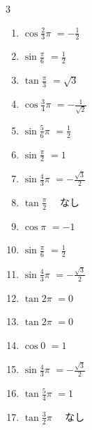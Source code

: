 \begin{multicols}{3}
\begin{enumerate}
  \item $\displaystyle \cos{\frac{2}{3}\pi}$
        $\displaystyle =-\frac{1}{2}$

  \item $\displaystyle \sin{\frac{\pi}{6}}$
        $\displaystyle =\frac{1}{2}$

  \item $\displaystyle \tan{\frac{\pi}{3}}$
        $\displaystyle =\sqrt{3}$

  \item $\displaystyle \cos{\frac{3}{4}\pi}$
        $\displaystyle =-\frac{1}{\sqrt{2}}$

  \item $\displaystyle \sin{\frac{5}{6}\pi}$
        $\displaystyle =\frac{1}{2}$

  \item $\displaystyle \sin{\frac{\pi}{2}}$
        $\displaystyle =1$

  \item $\displaystyle \sin{\frac{4}{3}\pi}$
        $\displaystyle =-\frac{\sqrt{3}}{2}$

  \item $\displaystyle \tan{\frac{\pi}{2}}$
        $\displaystyle \quad なし$

  \item $\displaystyle \cos{\pi}$
        $\displaystyle =-1$

  \item $\displaystyle \sin{\frac{\pi}{6}}$
        $\displaystyle =\frac{1}{2}$

  \item $\displaystyle \sin{\frac{4}{3}\pi}$
        $\displaystyle =-\frac{\sqrt{3}}{2}$

  \item $\displaystyle \tan{2\pi}$
        $\displaystyle =0$

  \item $\displaystyle \tan{2\pi}$
        $\displaystyle =0$

  \item $\displaystyle \cos{0}$
        $\displaystyle =1$

  \item $\displaystyle \sin{\frac{4}{3}\pi}$
        $\displaystyle =-\frac{\sqrt{3}}{2}$

  \item $\displaystyle \tan{\frac{5}{4}\pi}$
        $\displaystyle =1$

  \item $\displaystyle \tan{\frac{3}{2}\pi}$
        $\displaystyle \quad なし$


\end{enumerate}
\end{multicols}
